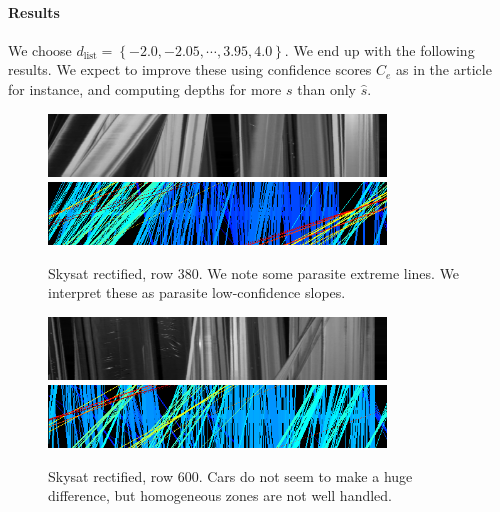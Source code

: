 \documentclass{article}
\def\epiWidth{0.8}
\theoremstyle{definition}
\begin{document}
\paragraph{Results} We choose $d_\text{list} = \left\{-2.0, -2.05, \cdots, 3.95, 4.0\right\}$. We end up with the following results. We expect to improve these using confidence scores $C_e$ as in the article for instance, and computing depths for more $s$ than only $\widehat{s}$.


\begin{figure}[ht]
  \centering
  \includegraphics[width=\epiWidth\textwidth]{1520204861279_epi.png}\\
  \includegraphics[width=\epiWidth\textwidth]{1520204861279_epi_colored.png}
  \caption{Skysat rectified, row 380. We note some parasite extreme lines. We interpret these as parasite low-confidence slopes.}
\end{figure}


\begin{figure}[ht]
  \centering
  \includegraphics[width=\epiWidth\textwidth]{1520205010590_epi.png}\\
  \includegraphics[width=\epiWidth\textwidth]{1520205010590_epi_colored.png}
  \caption{Skysat rectified, row 600. Cars do not seem to make a huge difference, but homogeneous zones are not well handled.}
\end{figure}
\end{document}
